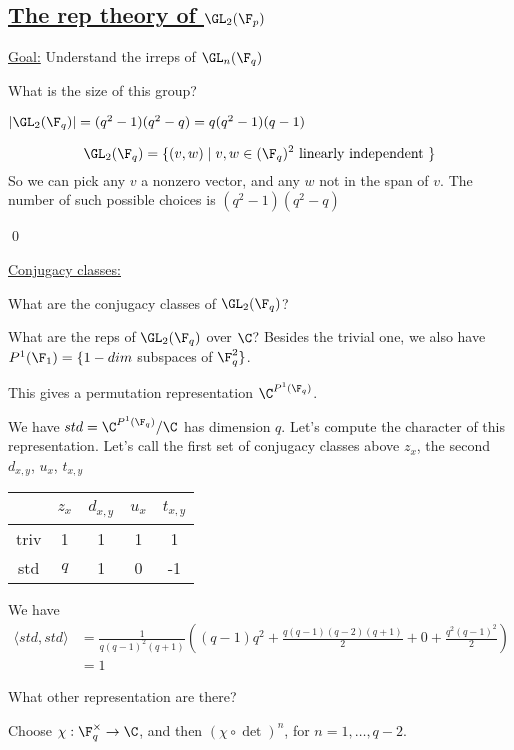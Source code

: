 \documentclass[x11names,reqno,14pt]{extarticle}
\begin{document}
\subsection*{\underline{The rep theory of $\GL_2(\F_p)$}}

\underline{Goal:} Understand the irreps of $\GL_n(\F_q)$

What is the size of this group?

$|\GL_2(\F_q)| = (q^2 - 1)(q^2 - q) = q(q^2 - 1)(q - 1)$

\proof

\[
\GL_2(\F_q) = \{(v, w) \mid v, w \in (\F_q)^2\text{ linearly independent }\}
\]
So we can pick any $v$ a nonzero vector, and any $w$ not in the span of $v$. The number of such possible choices is $(q^2 - 1)(q^2 - q)$

\qed

\underline{Conjugacy classes:}

What are the conjugacy classes of $\GL_2(\F_q)$?




What are the reps of $\GL_2(\F_q)$ over $\C$? Besides the trivial one, we also have $P^1(\F_1) = \{1-dim$ subspaces of $\F_q^2\}$.

This gives a permutation representation $\C^{P^1(\F_q)}$.

We have $std = \C^{P^1(\F_q)}/\C$ has dimension $q$. Let's compute the character of this representation. Let's call the first set of conjugacy classes above $z_x$, the second $d_{x, y}$, $u_x$, $t_{x,y}$

\begin{center}
\begin{tabular}{c| c c c c}
\, &$z_x$ & $d_{x, y}$ & $u_x$ & $t_{x,y}$ \\
\hline
triv & 1 & 1 & 1 & 1 \\
std & $q$ & 1 & 0 & -1 \\
\end{tabular}
\end{center}
We have 
\begin{align*}
\langle std, std \rangle & = \frac{1}{q(q-1)^2(q+1)}\left((q-1)q^2 + \frac{q(q-1)(q-2)(q+1)}{2} + 0 + \frac{q^2(q-1)^2}{2}\right) \\
& = 1
\end{align*}

What other representation are there?

Choose $\chi:\F_q^\times\to\C$, and then $(\chi\circ\det)^n$, for $n = 1, \dots, q-2$.
\end{document}

